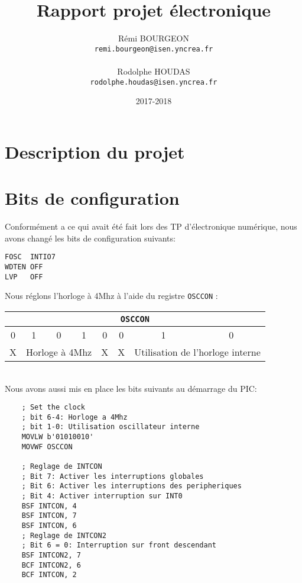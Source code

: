 \documentclass[a4paper,11pt,titlepage]{article}
\title{Rapport projet électronique}
\author{Rémi BOURGEON\\
\texttt{remi.bourgeon@isen.yncrea.fr}\\\\
Rodolphe HOUDAS\\
\texttt{rodolphe.houdas@isen.yncrea.fr}}
\date{2017-2018}
\begin{document}
\maketitle
\tableofcontents
\newpage


\section{Description du projet}

\section{Bits de configuration}

Conformément a ce qui avait été fait lors des TP d'électronique numérique, nous avons changé les bits de configuration suivants:\\

\begin{lstlisting}
FOSC  INTIO7
WDTEN OFF
LVP   OFF
\end{lstlisting}

Nous réglons l'horloge à 4Mhz à l'aide du registre \texttt{OSCCON} :\\

\begin{tabular}{|c|c|c|c|c|c|c|c|}
  \hline
  \multicolumn{8}{|c|}{\texttt{OSCCON}}\\
  \hline
  0 & 1 & 0 & 1 & 0 & 0 & 1 & 0\\
  \hline
  X & \multicolumn{3}{c|}{Horloge à 4Mhz} & X & X & \multicolumn{2}{c|}{Utilisation de l'horloge interne}\\
  \hline
\end{tabular}\\

Nous avons aussi mis en place les bits suivants au démarrage du PIC:

\begin{lstlisting}
    ; Set the clock
    ; bit 6-4: Horloge a 4Mhz
    ; bit 1-0: Utilisation oscillateur interne
    MOVLW b'01010010'
    MOVWF OSCCON
    
    ; Reglage de INTCON
    ; Bit 7: Activer les interruptions globales
    ; Bit 6: Activer les interruptions des peripheriques
    ; Bit 4: Activer interruption sur INT0
    BSF INTCON, 4
    BSF INTCON, 7
    BSF INTCON, 6
    ; Reglage de INTCON2
    ; Bit 6 = 0: Interruption sur front descendant
    BSF INTCON2, 7
    BCF INTCON2, 6
    BCF INTCON, 2
\end{lstlisting}
\end{document}
